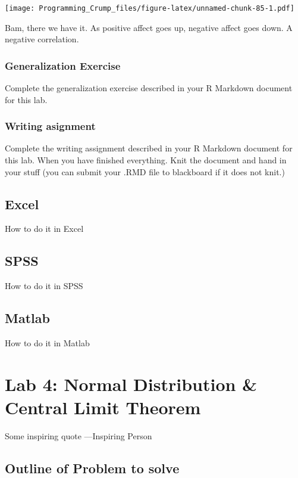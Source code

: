 \documentclass[]{book}
\theoremstyle{definition}
\theoremstyle{definition}
\theoremstyle{definition}
\theoremstyle{remark}
\begin{document}
\texttt{[image: Programming\_Crump\_files/figure-latex/unnamed-chunk-85-1.pdf]}

Bam, there we have it. As positive affect goes up, negative affect goes
down. A negative correlation.

\subsection{Generalization Exercise}\label{generalization-exercise-1}

Complete the generalization exercise described in your R Markdown
document for this lab.

\subsection{Writing asignment}\label{writing-asignment-1}

Complete the writing assignment described in your R Markdown document
for this lab. When you have finished everything. Knit the document and
hand in your stuff (you can submit your .RMD file to blackboard if it
does not knit.)

\section{Excel}\label{excel-2}

How to do it in Excel

\section{SPSS}\label{spss-2}

How to do it in SPSS

\section{Matlab}\label{matlab-2}

How to do it in Matlab

\chapter{Lab 4: Normal Distribution \& Central Limit
Theorem}\label{lab-4-normal-distribution-central-limit-theorem}

{ Some inspiring quote ---Inspiring Person }

\section{Outline of Problem to
solve}\label{outline-of-problem-to-solve-2}
\end{document}
